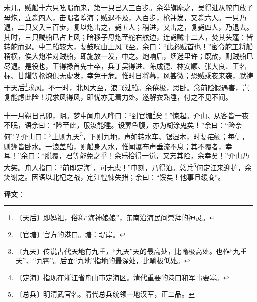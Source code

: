 \documentclass[12pt,UTF-8,openany,a4]{ctexbook}
\begin{document}
\begin{large}
    未几，贼船十六只吆喝而来，第一只已入三百步。余举旗麾之，吴得进从舵门放子母炮，立毙四人，击喝者堕海；贼退不及，入百步，枪并发，又毙六人。一只乃退，二只又入三百步，复以炮击之，毙五人；稍进，又击之，复毙四人，乃退去。其时，三只贼船已占上风；暗移子母炮至舵右舷边，连毙贼十二人，焚其头蓬：皆转舵而退。中二船较大，复鼓噪由上风飞至。余曰：“此必贼首也！”密令舵工将船稍横，俟大炮准对贼船，即施放一发，中之。炮响后，烟迷里许；既散，则贼船巳尽退。是役也，王得禄首先士卒，兵丁吴得进、陈成德、林安顺、张大良、王名标、甘耀等枪炮俱无虚发，幸免于危。惟时日将暮，风甚微；恐贼乘夜来袭，默祷于天后\footnote{〔天后〕\yiwen 即妈祖，俗称“海神娘娘”，东南沿海民间崇拜的神灵。}求风。不一时，北风大至，浪飞过船。余倦极，思卧。念前险假遇害，岂复能虑此险！况求风得风，即忧亦无着力处。遂解衣熟睡，付之不见不闻。
    
    十一月朔日己卯，阴。梦中闻舟人哗曰：“到官塘\footnote{〔官塘〕\yiwen 官方的港口。塘：堤岸。}矣！”惊起。介山、从客皆一夜不眠，语余曰：“险至此，服汝能睡。设葬鱼腹，亦为糊涂鬼矣！”余曰：“险奈何”？介山曰：“上则九天\footnote{〔九天〕\yiwen 传说古代天地有九重，“九天”天的最高处，比喻极高处。也作“九重天”、“九霄”。后面“九地”指地的最深处，比喻极低处。}，下则九地，声如转水车、锯湿木，时复疟颤；每侧，则篷皆卧水。一浪盖船，则船身入水，惟闻瀑布声垂流不息；其不覆者，幸耳！”余曰：“脱覆，君等能免之乎！余乐拾得一觉，又忘其险，余幸矣！”介山乃大笑。舟人指曰：“前即定海\footnote{〔定海〕\yiwen 指现在浙江省舟山市定海区。清代重要的港口和军事要塞。}，可无虑！”申刻，乃得泊。总兵\footnote{〔总兵〕\yiwen 明清武官名。清代总兵统领一地汉军，正二品。}何定江来迎护，余笑谢之。因语以北杞之战，定江惶悚失措；余曰：“馁矣！他事且缓商”。

\end{large}


\newpage

\begin{Large}
   \noindent \textbf{译文}：
\end{Large}

\vspace{1em}
\end{document}
